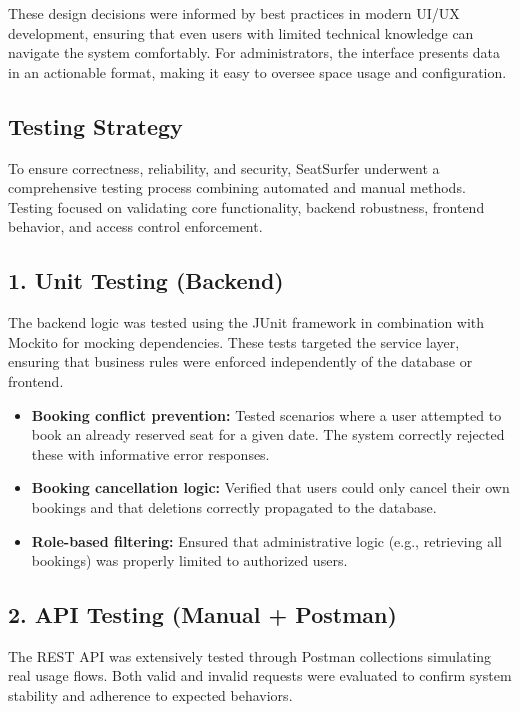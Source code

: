 \documentclass[12pt,a4paper]{report} %
\begin{document}
These design decisions were informed by best practices in modern UI/UX development, ensuring that even users with limited technical knowledge can navigate the system comfortably. For administrators, the interface presents data in an actionable format, making it easy to oversee space usage and configuration.

\subsection{Testing Strategy}

To ensure correctness, reliability, and security, SeatSurfer underwent a comprehensive testing process combining automated and manual methods. Testing focused on validating core functionality, backend robustness, frontend behavior, and access control enforcement.

\subsection*{1. Unit Testing (Backend)}

The backend logic was tested using the JUnit framework in combination with Mockito for mocking dependencies. These tests targeted the service layer, ensuring that business rules were enforced independently of the database or frontend.

\begin{itemize}
    \item \textbf{Booking conflict prevention:} Tested scenarios where a user attempted to book an already reserved seat for a given date. The system correctly rejected these with informative error responses.
    \item \textbf{Booking cancellation logic:} Verified that users could only cancel their own bookings and that deletions correctly propagated to the database.
    \item \textbf{Role-based filtering:} Ensured that administrative logic (e.g., retrieving all bookings) was properly limited to authorized users.
\end{itemize}

\subsection*{2. API Testing (Manual + Postman)}

The REST API was extensively tested through Postman collections simulating real usage flows. Both valid and invalid requests were evaluated to confirm system stability and adherence to expected behaviors.
\end{document}
